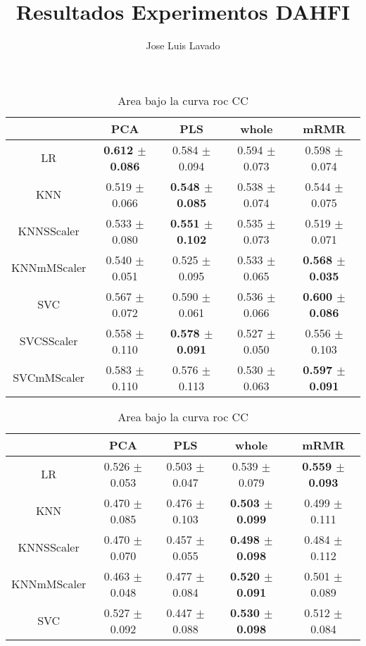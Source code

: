\documentclass[]{report}
\title{Resultados Experimentos DAHFI}
\author{Jose Luis Lavado}
\begin{document}
\maketitle

	\begin{table}
		\centering
		\setlength{\aboverulesep}{0pt}
		\setlength{\belowrulesep}{0pt}
		\begin{tabular}{c|cccc}
			\hline
			             & PCA             & PLS             & whole           & mRMR            \\
			\hline
			 LR          & \textbf{0.612 $\pm$ 0.086} & 0.584 $\pm$ 0.094 & 0.594 $\pm$ 0.073 & 0.598 $\pm$ 0.074 \\
			 KNN         & 0.519 $\pm$ 0.066 & \textbf{0.548 $\pm$ 0.085} & 0.538 $\pm$ 0.074 & 0.544 $\pm$ 0.075 \\
			 KNNSScaler  & 0.533 $\pm$ 0.080 & \textbf{0.551 $\pm$ 0.102} & 0.535 $\pm$ 0.073 & 0.519 $\pm$ 0.071 \\
			 KNNmMScaler & 0.540 $\pm$ 0.051 & 0.525 $\pm$ 0.095 & 0.533 $\pm$ 0.065 & \textbf{0.568 $\pm$ 0.035} \\
			 SVC         & 0.567 $\pm$ 0.072 & 0.590 $\pm$ 0.061 & 0.536 $\pm$ 0.066 & \textbf{0.600 $\pm$ 0.086} \\
			 SVCSScaler  & 0.558 $\pm$ 0.110 & \textbf{0.578 $\pm$ 0.091} & 0.527 $\pm$ 0.050 & 0.556 $\pm$ 0.103 \\
			 SVCmMScaler & 0.583 $\pm$ 0.110 & 0.576 $\pm$ 0.113 & 0.530 $\pm$ 0.063 & \textbf{0.597 $\pm$ 0.091} \\
			\hline
		\end{tabular}
		\caption{\label{tab:auc_score_CC} Area bajo la curva roc CC}
		\vspace*{2cm}
		\begin{tabular}{c|cccc}
			\hline
			             & PCA             & PLS             & whole           & mRMR            \\
			\hline
			 LR          & 0.526 $\pm$ 0.053 & 0.503 $\pm$ 0.047 & 0.539 $\pm$ 0.079 & \textbf{0.559 $\pm$ 0.093} \\
			 KNN         & 0.470 $\pm$ 0.085 & 0.476 $\pm$ 0.103 & \textbf{0.503 $\pm$ 0.099} & 0.499 $\pm$ 0.111 \\
			 KNNSScaler  & 0.470 $\pm$ 0.070 & 0.457 $\pm$ 0.055 & \textbf{0.498 $\pm$ 0.098} & 0.484 $\pm$ 0.112 \\
			 KNNmMScaler & 0.463 $\pm$ 0.048 & 0.477 $\pm$ 0.084 & \textbf{0.520 $\pm$ 0.091} & 0.501 $\pm$ 0.089 \\
			 SVC         & 0.527 $\pm$ 0.092 & 0.447 $\pm$ 0.088 & \textbf{0.530 $\pm$ 0.098} & 0.512 $\pm$ 0.084 \\

\end{tabular}
\end{table}
\end{document}
